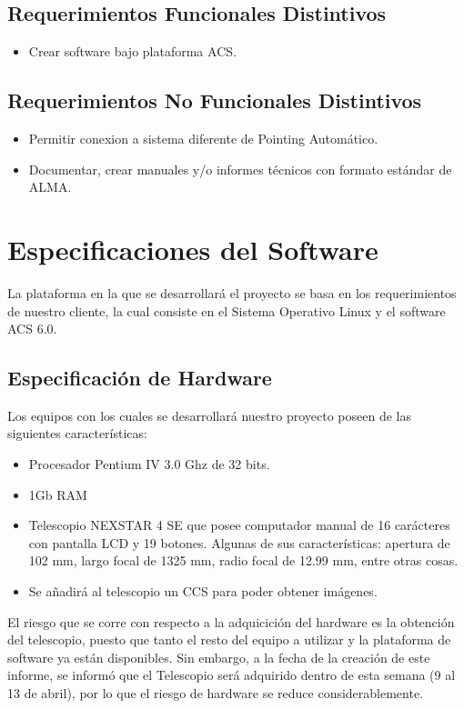 \documentclass[letterpaper,spanish,10pt]{article}
\begin{document}
\subsection{Requerimientos Funcionales Distintivos}
\begin{itemize}
	\item Crear software bajo plataforma ACS.
\end{itemize}

\subsection{Requerimientos No Funcionales Distintivos}
\begin{itemize}
	\item Permitir conexion a sistema diferente de Pointing Autom\'atico.
	\item Documentar, crear manuales y/o informes t\'ecnicos con formato est\'andar de ALMA.
\end{itemize}


\newpage


\section{Especificaciones del Software}
La plataforma en la que se desarrollar\'a el proyecto se basa en los requerimientos de nuestro cliente, la cual consiste en el Sistema Operativo Linux y el software ACS 6.0.

\subsection{Especificaci\'on de Hardware}
Los equipos con los cuales se desarrollar\'a nuestro proyecto poseen de las siguientes caracter\'isticas:

\begin{itemize}
	\item Procesador Pentium IV 3.0 Ghz de 32 bits.
	\item 1Gb RAM
	\item Telescopio NEXSTAR 4 SE que posee computador manual de 16 car\'acteres con pantalla LCD y 19 botones. Algunas de sus caracter\'isticas: apertura de 102 mm, largo focal de 1325 mm, radio focal de 12.99 mm, entre otras cosas.
	\item Se a\~nadir\'a al telescopio un CCS para poder obtener im\'agenes.
\end{itemize}

El riesgo que se corre con respecto a la adquicici\'on del hardware es la obtenci\'on del telescopio, puesto que tanto el resto del equipo a utilizar y la plataforma de software ya est\'an disponibles.
Sin embargo, a la fecha de la creaci\'on de este informe, se inform\'o que el Telescopio ser\'a adquirido dentro de esta semana (9 al 13 de abril), por lo que el riesgo de hardware se reduce considerablemente.
\end{document}
